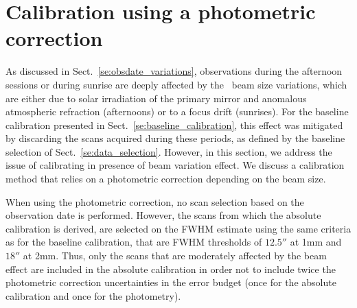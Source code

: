\section{Calibration using a photometric correction}%
\label{se:photocorr_calibration}

As discussed in Sect.~\ref{se:obsdate_variations}, observations during the
afternoon sessions or
during sunrise are deeply affected by the \afternoon\ beam
size variations, which are either due to solar irradiation
of the primary mirror and anomalous atmospheric refraction
(afternoons) or to a focus drift (sunrises).
For the baseline calibration presented in
Sect.~\ref{se:baseline_calibration}, this effect was mitigated by
discarding the scans acquired during these periods, as defined by the
baseline selection of Sect.~\ref{se:data_selection}. However, in
this section, we address the issue of calibrating in presence of
\afternoon beam variation effect. We discuss a
calibration method that relies on a photometric correction
depending on the beam size. 

When using the photometric correction, no scan selection based on the
observation date is performed. However, the scans from which the
absolute calibration is derived, are selected on the FWHM estimate
using the same criteria as for the baseline calibration, that are FWHM
thresholds of $12.5''$ at 1mm and $18''$ at 2mm.  Thus, only
the scans that are moderately affected by the beam effect are included
in the absolute calibration in order not to include twice the
photometric correction uncertainties in the error budget (once for the
absolute calibration and once for the photometry).

